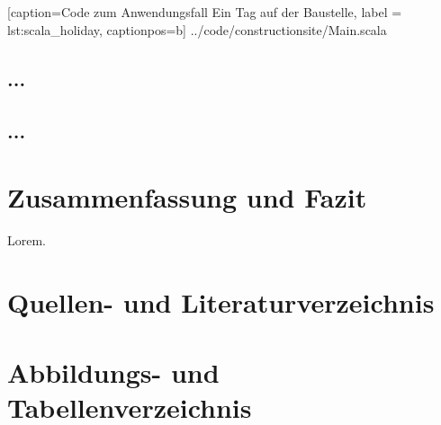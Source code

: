 \documentclass[11pt,a4paper,titlepage,ngerman]{scrartcl}
\begin{document}

    [caption={Code zum Anwendungsfall \glqq Ein Tag auf der Baustelle\grqq },
       label = lst:scala_holiday,
       captionpos=b]
 {../code/constructionsite/Main.scala}

\subsection{...}
\subsection{...}

\newpage
\section{Zusammenfassung und Fazit}

Lorem.

\newpage

\section{Quellen- und Literaturverzeichnis}




\section{Abbildungs- und Tabellenverzeichnis}

\renewcommand{\listfigurename}{Verzeichnis der Abbildungen}
\listoffigures

\newpage

\printglossary
\end{document}
